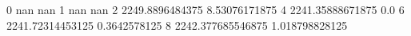 0 nan nan
1 nan nan
2 2249.8896484375 8.53076171875
4 2241.35888671875 0.0
6 2241.72314453125 0.3642578125
8 2242.377685546875 1.018798828125
